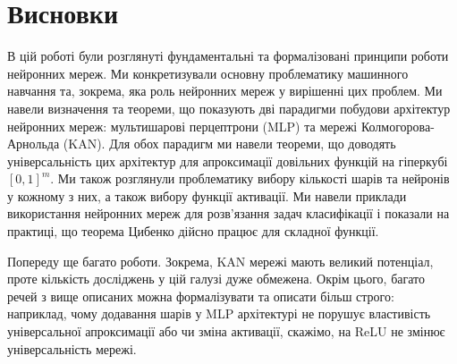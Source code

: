\chapter*{Висновки}

\hspace{\parindent} В цій роботі були розглянуті фундаментальні та формалізовані
принципи роботи нейронних мереж. Ми конкретизували основну проблематику 
машинного навчання та, зокрема, яка роль нейронних мереж у вирішенні цих
проблем. Ми навели визначення та теореми, що показують дві парадигми 
побудови архітектур нейронних мереж: мультишарові перцептрони (MLP) та 
мережі Колмогорова-Арнольда (KAN). Для обох парадигм ми навели теореми,
що доводять універсальність цих архітектур для апроксимації довільних 
функцій на гіперкубі $[0, 1]^m$. Ми також розглянули проблематику
вибору кількості шарів та нейронів у кожному з них, а також вибору
функції активації. Ми навели приклади використання нейронних мереж для
розв'язання задач класифікації і показали на практиці, що теорема 
Цибенко дійсно працює для складної функції. 

Попереду ще багато роботи. Зокрема, KAN мережі мають великий потенціал, проте 
кількість досліджень у цій галузі дуже обмежена. Окрім цього, багато речей 
з вище описаних можна формалізувати та описати більш строго: наприклад,
чому додавання шарів у MLP архітектурі не порушує властивість 
універсальної апроксимації або чи зміна активації, скажімо, на 
ReLU не змінює універсальність мережі.
